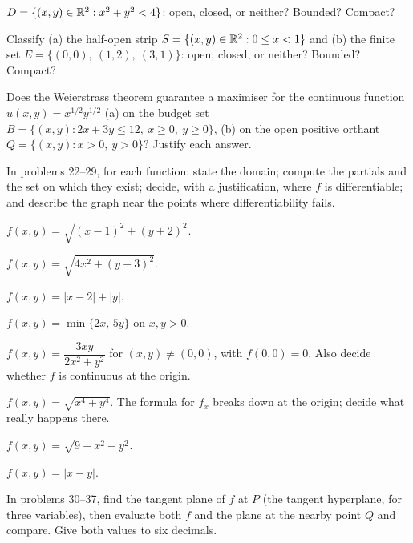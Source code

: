 \begin{problems}
        $D=\{(x,y)\in\mathbb{R}^2 : x^2+y^2<4\}$: open, closed, or neither?
        Bounded? Compact?
  \item Classify (a) the half-open strip
        $S=\{(x,y)\in\mathbb{R}^2 : 0\le x<1\}$ and (b) the finite set
        $E=\{(0,0),\ (1,2),\ (3,1)\}$: open, closed, or neither?
        Bounded? Compact?
  \item Does the Weierstrass theorem guarantee a maximiser for the
        continuous function $u(x,y)=x^{1/2}y^{1/2}$ (a) on the budget
        set $B=\{(x,y): 2x+3y\le12,\ x\ge0,\ y\ge0\}$, (b) on the open
        positive orthant $Q=\{(x,y): x>0,\ y>0\}$? Justify each
        answer.
\end{problems}

In problems 22--29, for each function: state the domain; compute the
partials and the set on which they exist; decide, with a justification,
where $f$ is differentiable; and describe the graph near the points where
differentiability fails.

\begin{problems}[resume]
  \item $f(x,y)=\sqrt{(x-1)^{2}+(y+2)^{2}}$.
  \item $f(x,y)=\sqrt{4x^{2}+(y-3)^{2}}$.
  \item $f(x,y)=|x-2|+|y|$.
  \item $f(x,y)=\min\{2x,\,5y\}$ on $x,y>0$.
  \item $f(x,y)=\dfrac{3xy}{2x^{2}+y^{2}}$ for $(x,y)\neq(0,0)$, with
        $f(0,0)=0$. Also decide whether $f$ is continuous at the origin.
  \item $f(x,y)=\sqrt{x^{4}+y^{4}}$. The formula for $f_{x}$ breaks down
        at the origin; decide what really happens there.
  \item $f(x,y)=\sqrt{9-x^{2}-y^{2}}$.
  \item $f(x,y)=|x-y|$.
\end{problems}

In problems 30--37, find the tangent plane of $f$ at $P$ (the tangent
hyperplane, for three variables), then evaluate both $f$ and the plane at
the nearby point $Q$ and compare. Give both values to six decimals.

